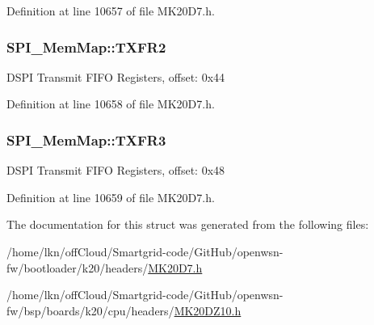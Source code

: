 Definition at line 10657 of file M\+K20\+D7.\+h.

\subsubsection[{\texorpdfstring{T\+X\+F\+R2}{TXFR2}}]{ S\+P\+I\+\_\+\+Mem\+Map\+::\+T\+X\+F\+R2}\hypertarget{struct_s_p_i___mem_map_a2e65235ded22e36d3dae2b17f172a32b}{}\label{struct_s_p_i___mem_map_a2e65235ded22e36d3dae2b17f172a32b}
D\+S\+PI Transmit F\+I\+FO Registers, offset\+: 0x44 

Definition at line 10658 of file M\+K20\+D7.\+h.

\subsubsection[{\texorpdfstring{T\+X\+F\+R3}{TXFR3}}]{ S\+P\+I\+\_\+\+Mem\+Map\+::\+T\+X\+F\+R3}\hypertarget{struct_s_p_i___mem_map_a817203724ca73f53cc544f887eeabd27}{}\label{struct_s_p_i___mem_map_a817203724ca73f53cc544f887eeabd27}
D\+S\+PI Transmit F\+I\+FO Registers, offset\+: 0x48 

Definition at line 10659 of file M\+K20\+D7.\+h.



The documentation for this struct was generated from the following files\+:\begin{DoxyCompactItemize}
\item 
/home/lkn/off\+Cloud/\+Smartgrid-\/code/\+Git\+Hub/openwsn-\/fw/bootloader/k20/headers/\hyperlink{bootloader_2k20_2headers_2_m_k20_d7_8h}{M\+K20\+D7.\+h}\item 
/home/lkn/off\+Cloud/\+Smartgrid-\/code/\+Git\+Hub/openwsn-\/fw/bsp/boards/k20/cpu/headers/\hyperlink{_m_k20_d_z10_8h}{M\+K20\+D\+Z10.\+h}\end{DoxyCompactItemize}
